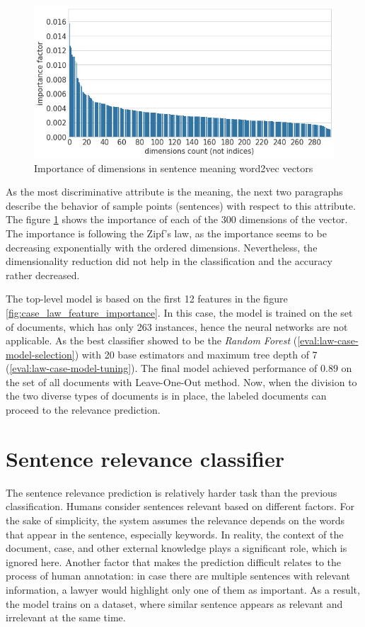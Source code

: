 \documentclass[
  digital, %
  notable,   %
  nolof,     %
  nolot,     %
]{fithesis3}
\begin{document}
\begin{figure}[h]
\caption{Importance of dimensions in sentence meaning word2vec vectors}
\label{fig:vec_importance_caselaw}
\includegraphics[width=\textwidth]{img/vec_importance_caselaw}
\end{figure}

As the most discriminative attribute is the meaning, the next two paragraphs describe the behavior of sample points (sentences) with respect to this attribute.
The figure \ref{fig:vec_importance_caselaw} shows the importance of each of the 300 dimensions of the vector.
The importance is following the Zipf's law, as the importance seems to be decreasing exponentially with the ordered dimensions.
Nevertheless, the dimensionality reduction did not help in the classification and the accuracy rather decreased.

The top-level model is based on the first 12 features in the figure \ref{fig:case_law_feature_importance}.
In this case, the model is trained on the set of documents, which has only 263 instances, hence the neural networks are not applicable.
As the best classifier showed to be the \textit{Random Forest} (\ref{eval:law-case-model-selection}) with 20 base estimators and maximum tree depth of 7 (\ref{eval:law-case-model-tuning}). The final model achieved performance of $0.89$ on the set of all documents with Leave-One-Out method. Now, when the division to the two diverse types of documents is in place, the labeled documents can proceed to the relevance prediction.

\section{Sentence relevance classifier}
\label{sec:sentence-classifier}
The sentence relevance prediction is relatively harder task than the previous classification.
Humans consider sentences relevant based on different factors.
For the sake of simplicity, the system assumes the relevance depends on the words that appear in the sentence, especially keywords.
In reality, the context of the document, case, and other external knowledge plays a significant role, which is ignored here.
Another factor that makes the prediction difficult relates to the process of human annotation: in case there are multiple sentences with relevant information, a lawyer would highlight only one of them as important.
As a result, the model trains on a dataset, where similar sentence appears as relevant and irrelevant at the same time.
\end{document}
